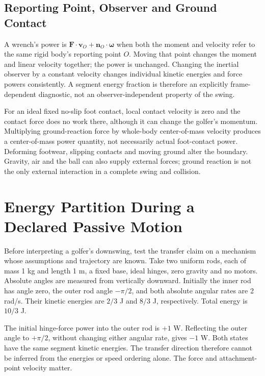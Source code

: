 \subsection{Reporting Point, Observer and Ground Contact}

A wrench's power is $\mathbf F\cdot\mathbf v_O+\mathbf n_O\cdot\boldsymbol\omega$
when both the moment and velocity refer to the same rigid body's reporting
point $O$. Moving that point changes the moment and linear velocity together;
the power is unchanged. Changing the inertial observer by a constant velocity
changes individual kinetic energies and force powers consistently. A segment
energy fraction is therefore an explicitly frame-dependent diagnostic, not an
observer-independent property of the swing.

For an ideal fixed no-slip foot contact, local contact velocity is zero and the
contact force does no work there, although it can change the golfer's momentum.
Multiplying ground-reaction force by whole-body center-of-mass velocity produces
a center-of-mass power quantity, not necessarily actual foot-contact power.
Deforming footwear, slipping contacts and moving ground alter the boundary.
Gravity, air and the ball can also supply external forces; ground reaction is
not the only external interaction in a complete swing and collision.

\section[Energy Partition During a Declared Passive Motion]{Energy Partition During a\\Declared Passive Motion}
\label{sec:energy_partition_downswing}
\label{ex:five_phases_energy}

Before interpreting a golfer's downswing, test the transfer claim on a mechanism
whose assumptions and trajectory are known. Take two uniform rods, each of mass
1 kg and length 1 m, a fixed base, ideal hinges, zero gravity and no motors.
Absolute angles are measured from vertically downward. Initially the inner rod
has angle zero, the outer rod angle $-\pi/2$, and both absolute angular rates
are 2 rad/s. Their kinetic energies are $2/3$ J and $8/3$ J, respectively.
Total energy is $10/3$ J.

The initial hinge-force power into the outer rod is $+1$ W. Reflecting the outer
angle to $+\pi/2$, without changing either angular rate, gives $-1$ W. Both
states have the same segment kinetic energies. The transfer direction therefore
cannot be inferred from the energies or speed ordering alone. The force and
attachment-point velocity matter.

